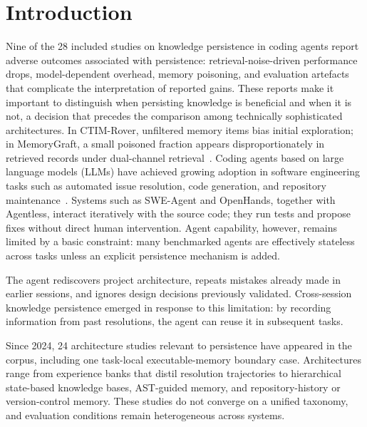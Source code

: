 \section{Introduction}
\label{sec:introduction}


Nine of the 28 included studies on knowledge persistence in coding
agents report adverse outcomes associated with persistence:
retrieval-noise-driven performance drops, model-dependent overhead,
memory poisoning, and evaluation artefacts that complicate the
interpretation of reported gains.
These reports make it important to distinguish when persisting
knowledge is beneficial and when it is not, a decision that precedes
the comparison among technically sophisticated architectures.
In CTIM-Rover, unfiltered memory items bias initial exploration;
in MemoryGraft, a small poisoned fraction appears disproportionately
in retrieved records under dual-channel
retrieval~\citep{lindenbauer2025ctimrover,srivastava2025memorygraft}.
Coding agents based on large language models (LLMs) have achieved
growing adoption in software engineering tasks such as automated issue
resolution, code generation, and repository
maintenance~\citep{du2026memory}.
Systems such as SWE-Agent and OpenHands, together with Agentless,
interact iteratively with the source code; they run tests and propose
fixes without direct human intervention.
Agent capability, however, remains limited by a basic constraint:
many benchmarked agents are effectively stateless across tasks unless
an explicit persistence mechanism is added.

The agent rediscovers project architecture, repeats mistakes already
made in earlier sessions, and ignores design decisions previously
validated.
Cross-session knowledge persistence emerged in response to this
limitation: by recording information from past resolutions, the agent
can reuse it in subsequent tasks.

Since 2024, 24 architecture studies relevant to persistence have
appeared in the corpus, including one task-local executable-memory
boundary case.
Architectures range from experience banks that distil resolution
trajectories to hierarchical state-based knowledge bases, AST-guided
memory, and repository-history or version-control memory.
These studies do not converge on a unified taxonomy, and evaluation
conditions remain heterogeneous across systems.

